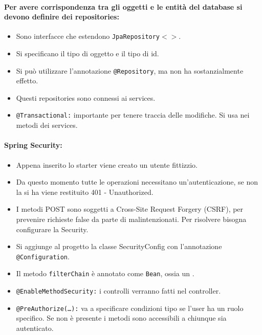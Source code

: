 \paragraph{Per avere corrispondenza tra gli oggetti e le entità del database si devono definire dei repositories:}

\begin{itemize}
	\item Sono interfacce che estendono \texttt{JpaRepository$<>$}.
	\item Si specificano il tipo di oggetto e il tipo di id.
	\item Si può utilizzare l'annotazione \texttt{@Repository}, ma non ha sostanzialmente effetto.
	\item Questi repositories sono connessi ai services.
	\item \texttt{@Transactional:} importante per tenere traccia delle modifiche. Si usa nei metodi dei services.
\end{itemize}


\paragraph{Spring Security:}

\begin{itemize}
	\item Appena inserito lo starter viene creato un utente fittizzio.
	\item Da questo momento tutte le operazioni necessitano un'autenticazione, se non la si ha viene restituito 401 - Unauthorized.
	\item I metodi POST sono soggetti a Cross-Site Request Forgery (CSRF), per prevenire richieste false da parte di malintenzionati. Per risolvere bisogna configurare la Security.
	\item Si aggiunge al progetto la classe SecurityConfig con l'annotazione \texttt{@Configuration}.
	\item Il metodo \texttt{filterChain} è annotato come \texttt{Bean}, ossia un .
	\item \texttt{@EnableMethodSecurity:} i controlli verranno fatti nel controller.
	\item \texttt{@PreAuthorize(\dots):} va a specificare condizioni tipo se l'user ha un ruolo specifico. Se non è presente i metodi sono accessibili a chiunque sia autenticato.
\end{itemize}

